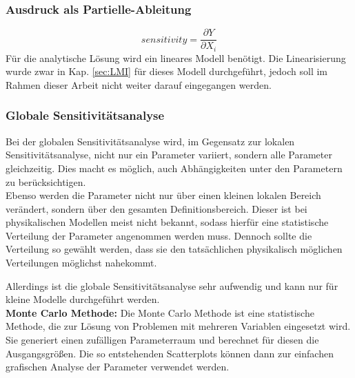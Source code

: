 \subsubsection*{Ausdruck als Partielle-Ableitung}
\begin{equation}
    sensitivity=\frac{\partial Y}{\partial X_i}
\end{equation}
Für die analytische Lösung wird ein lineares Modell benötigt. Die Linearisierung wurde zwar in Kap. \ref{sec:LMI} für dieses Modell durchgeführt, jedoch soll im Rahmen dieser Arbeit nicht weiter darauf eingegangen werden.
\subsubsection*{Globale Sensitivitätsanalyse}
Bei der globalen Sensitivitätsanalyse wird, im Gegensatz zur lokalen Sensitivitätsanalyse, nicht nur ein Parameter variiert, sondern alle Parameter gleichzeitig.
Dies macht es möglich, auch Abhängigkeiten unter den Parametern zu berücksichtigen. \\
Ebenso werden die Parameter nicht nur über einen kleinen lokalen Bereich verändert, sondern über den gesamten Definitionsbereich.
Dieser ist bei physikalischen Modellen meist nicht bekannt, sodass hierfür eine statistische Verteilung der Parameter angenommen werden muss.
Dennoch sollte die Verteilung so gewählt werden, dass sie den tatsächlichen physikalisch möglichen Verteilungen möglichst nahekommt.

Allerdings ist die globale Sensitivitätsanalyse sehr aufwendig und kann nur für kleine Modelle durchgeführt werden.\\

\textbf{Monte Carlo Methode:}
Die Monte Carlo Methode ist eine statistische Methode, die zur Lösung von Problemen mit mehreren Variablen eingesetzt wird.
Sie generiert einen zufälligen Parameterraum und berechnet für diesen die Ausgangsgrößen.
Die so entstehenden Scatterplots können dann zur einfachen grafischen Analyse der Parameter verwendet werden.


